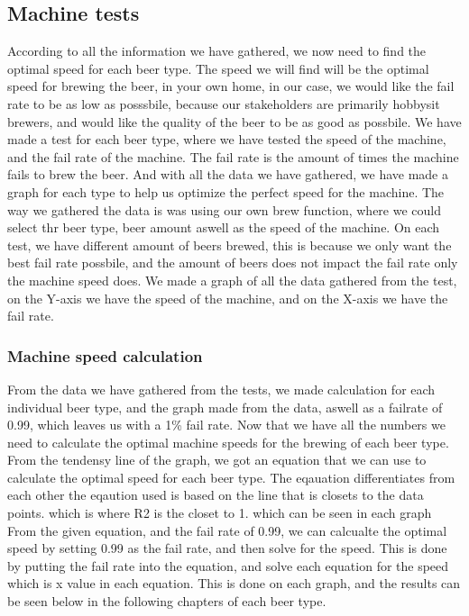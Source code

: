 \subsection{Machine tests}
According to all the information we have gathered, we now need to find the optimal speed for each beer type. The speed we will find will be the optimal speed for brewing the beer, in your own home, in our case,
we would like the fail rate to be as low as posssbile, because our stakeholders are primarily hobbysit brewers, and would like the quality of the beer to be as good as possbile.
We have made a test for each beer type, where we have tested the speed of the machine, and the fail rate of the machine. The fail rate is the amount of times the machine fails to brew the beer.
And with all the data we have gathered, we have made a graph for each type to help us optimize the perfect speed for the machine. \newline
The way we gathered the data is was using our own brew function, where we could select thr beer type, beer amount aswell as the speed of the machine. On each test, we have different amount of beers brewed, this is because we only want the best fail rate possbile, and the amount of beers does not impact the fail rate only the machine speed does.
We made a graph of all the data gathered from the test, on the Y-axis we have the speed of the machine, and on the X-axis we have the fail rate. \newline

\subsubsection{Machine speed calculation}
From the data we have gathered from the tests, we made calculation for each individual beer type, and the graph made from the data, aswell as a failrate of 0.99, 
which leaves us with a 1\% fail rate. Now that we have all the numbers we need to calculate the optimal machine speeds for the brewing of each beer type. \newline
From the tendensy line of the graph, we got an equation that we can use to calculate the optimal speed for each beer type. The eqauation differentiates from each other the eqaution used is based on the line that is closets to the data points. which is where R2 is the closet to 1. which can be seen in each graph \newline
From the given equation, and the fail rate of 0.99, we can calcualte the optimal speed by setting 0.99 as the fail rate, and then solve for the speed. This is done by putting the fail rate into the equation, and solve each equation for the speed which is x value in each equation. \newline
This is done on each graph, and the results can be seen below in the following chapters of each beer type. \newline



